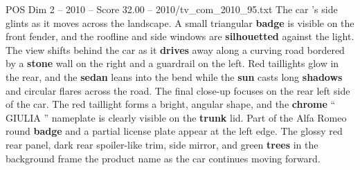 \begin{textsample}{POS Dim 2 – 2010 – Score 32.00 – 2010/tv\_com\_2010\_95.txt}
The car ’s side glints as it moves across the landscape.
A small triangular \textbf{badge} is visible on the front fender, and the roofline and side windows are \textbf{silhouetted} against the light.
The view shifts behind the car as it \textbf{drives} away along a curving road bordered by a \textbf{stone} wall on the right and a guardrail on the left.
Red taillights glow in the rear, and the \textbf{sedan} leans into the bend while the \textbf{sun} casts long \textbf{shadows} and circular flares across the road.
The final close-up focuses on the rear left side of the car.
The red taillight forms a bright, angular shape, and the \textbf{chrome} “ GIULIA ” nameplate is clearly visible on the \textbf{trunk} lid.
Part of the Alfa Romeo round \textbf{badge} and a partial license plate appear at the left edge.
The glossy red rear panel, dark rear spoiler-like trim, side mirror, and green \textbf{trees} in the background frame the product name as the car continues moving forward.

\end{textsample}
